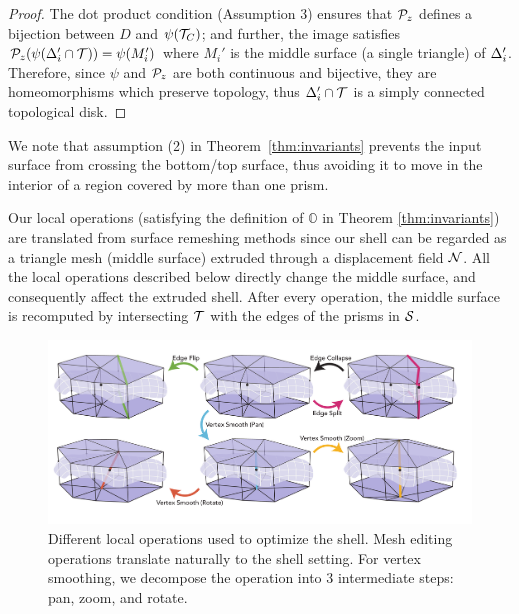 \begin{proof}
    The dot product condition (Assumption 3) ensures that $\P_z$ defines a bijection between $D$ and $\psi(\T_C)${;} and further, the image {satisfies} $\P_z(\psi(\Prism_i'\cap \T)) = \psi(M_i')$ where $M_i'$ is the middle surface (a single triangle) of $\Prism_i'$.
    Therefore, since $\psi$ and $\P_z$ are both continuous and bijective, they are homeomorphisms which preserve topology, 
    thus $\Prism_i'\cap \T $ is a simply connected topological disk.
\end{proof}


We note that assumption (2) in Theorem~\ref{thm:invariants} prevents the input surface from crossing the bottom/top surface, thus avoiding it to move in the interior of a region covered by more than one prism. 

Our local operations (satisfying the definition of $\mathbb{O}$ in Theorem \ref{thm:invariants}) are translated from surface remeshing methods \cite{dunyach2013adaptive} since our shell can be regarded as a triangle mesh (middle surface) extruded through a displacement field $\N$. All the local operations described below directly change the middle surface, and consequently affect the extruded shell. After every operation, the middle surface is recomputed by intersecting $\T$ with the edges of the prisms in $\S$.
\begin{figure}
    \centering
    \includegraphics[width=0.9\linewidth]{prism-tex/figs/local-operations}
    \caption{Different local operations used to optimize the shell. Mesh editing operations translate naturally to the shell setting. For vertex smoothing, we decompose the operation into 3 intermediate steps: pan, zoom, and rotate.}
    \label{prism:fig:local_operations}
    
\end{figure}

